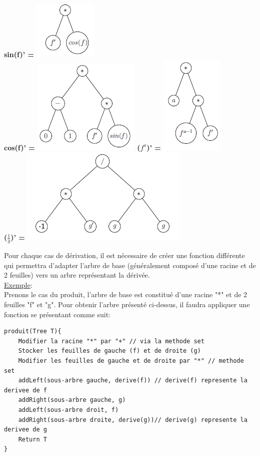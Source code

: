 \documentclass[10pt,a4paper]{article}
\begin{document}
\textbf{sin(f)' =} \includegraphics[scale=1]{q9-sinf.png} \\
\textbf{cos(f)' =} \includegraphics[scale=1]{q9-cosf.png}
\textbf{($f^{a}$)' =} \includegraphics[scale=1]{q9-fa.png}\\
\textbf{($\frac{1}{g}$)' =} \includegraphics[scale=1]{q9-1divg.png} 

Pour chaque cas de dérivation, il est nécessaire de créer une fonction différente qui permettra d'adapter l'arbre de base (généralement composé d'une racine et de 2 feuilles) vers un arbre représentant la dérivée.\\

\underline{Exemple}:\\

Prenons le cas du produit, l'arbre de base est constitué d'une racine "*" et de 2 feuilles "f" et "g". Pour obtenir l'arbre présenté ci-dessus, il faudra appliquer une fonction se présentant comme suit:

\begin{lstlisting}
produit(Tree T){
    Modifier la racine "*" par "+" // via la methode set
	Stocker les feuilles de gauche (f) et de droite (g)
	Modifier les feuilles de gauche et de droite par "*" // methode set
	addLeft(sous-arbre gauche, derive(f)) // derive(f) represente la derivee de f
	addRight(sous-arbre gauche, g)
	addLeft(sous-arbre droit, f)
	addRight(sous-arbre droite, derive(g))// derive(g) represente la derivee de g
	Return T 
}
\end{lstlisting}
\end{document}
